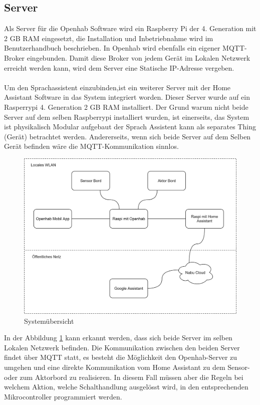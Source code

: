 \subsection{Server}\label{subsec: Server}
Als Server für die Openhab Software wird ein Raspberry Pi der 4. Generation mit 2 GB RAM eingesetzt, die Installation und Inbetriebnahme wird im Benutzerhandbuch beschrieben. In Openhab wird ebenfalls ein eigener MQTT-Broker eingebunden. Damit diese Broker von jedem Gerät im Lokalen Netzwerk erreicht werden kann, wird dem Server eine Statische IP-Adresse vergeben.\\
\\
Um den Sprachassistent einzubinden,ist ein weiterer Server mit der Home Assistant Software in das System integriert worden. Dieser Server wurde auf ein Rasperrypi 4. Generation 2 GB RAM installiert. Der Grund warum nicht beide Server auf dem selben Raspberrypi installiert wurden, ist einerseits, das System ist physikalisch Modular aufgebaut der Sprach Assistent kann als separates Thing (Gerät) betrachtet werden. Andererseits, wenn sich beide Server auf dem Selben Gerät befinden wäre die MQTT-Kommunikation sinnlos.  



\begin{figure}[H]
	\centering
	\includegraphics[width=\textwidth]{graphics/Systemubersicht.png}
	\caption{Systemübersicht}
	\label{pic: Systemübersicht}
\end{figure}   

In der Abbildung \ref{pic: Systemübersicht} kann erkannt werden, dass sich beide Server im selben Lokalen Netzwerk befinden. Die Kommunikation zwischen den beiden Server findet über MQTT statt, es besteht die Möglichkeit den Openhab-Server zu umgehen und eine direkte Kommunikation vom Home Assistant zu dem Sensor- oder zum Aktorbord zu realisieren. In diesem Fall müssen aber die Regeln bei welchem Aktion, welche Schalthandlung ausgelösst wird, in den entsprechenden Mikrocontroller programmiert werden.

